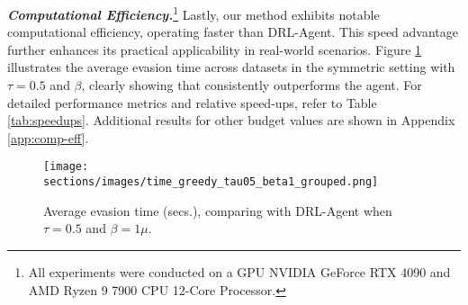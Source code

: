 
\textbf{\textit{Computational Efficiency.}}\footnote{All experiments were conducted on a GPU NVIDIA GeForce RTX 4090 and AMD Ryzen 9 7900 CPU 12-Core Processor.}
Lastly, our method exhibits notable computational efficiency, operating faster than DRL-Agent. This speed advantage further enhances its practical applicability in real-world scenarios. Figure \ref{fig:time} illustrates the average evasion time across datasets in the symmetric setting with $\tau=0.5$ and $\beta$, clearly showing that \method{} consistently outperforms the agent. For detailed performance metrics and relative speed-ups, refer to Table \ref{tab:speedups}. Additional results for other budget values are shown in Appendix \ref{app:comp-eff}.

\begin{figure}[htbp!]
    \centering
    \texttt{[image: sections/images/time\_greedy\_tau05\_beta1\_grouped.png]}
    \caption{Average evasion time (secs.), comparing \method{} with DRL-Agent when $\tau=0.5$ and $\beta=1\mu$. }
    \label{fig:time}
    \vspace{-3mm}
\end{figure}

\begin{table}[htbp!]
\centering
\caption{Speed-up (secs.) of \method{} compared to DRL-Agent in evading $\f$ when $\tau=0.5$ and $\beta=1\mu$.}
\label{tab:speedups}
\end{table}



